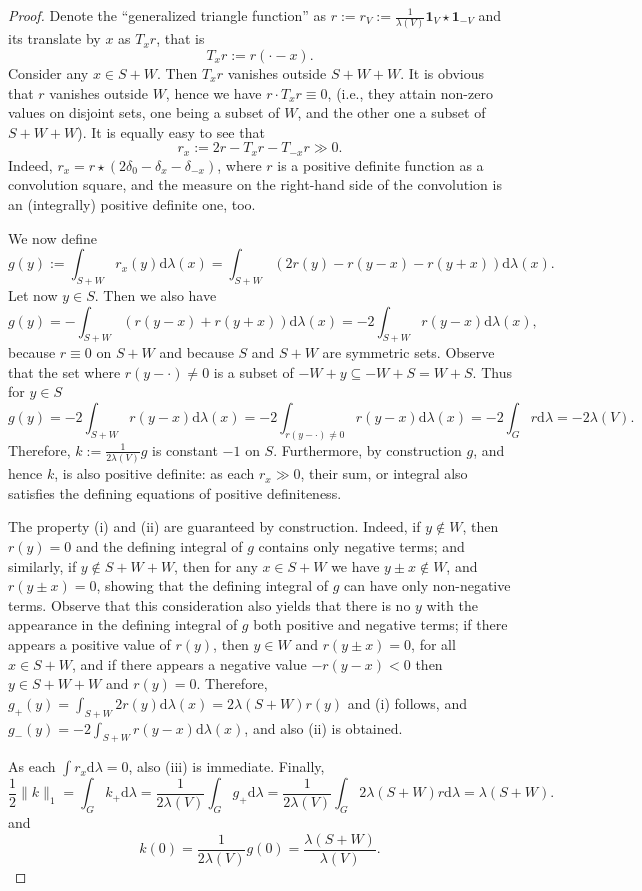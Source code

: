 \documentclass[[a4paper,english,12pt]{amsart}
\theoremstyle{plain}
\theoremstyle{remark}
\def\dd{\mathrm{d}}
\def\haar{\lambda}
\def\car{\mathbf{1}}
\begin{document}
\begin{proof} Denote the ``generalized triangle function'' as $r:=r_V:=\frac{1}{\lambda(V)} \car_V \star \car_{-V}$ and its translate by $x$ as $T_xr$, that is
\[
T_xr:=r(\cdot-x).
\]
Consider any $x \in S+ W$. Then $T_xr$ vanishes outside $S+W+W$. It is obvious that $r$ vanishes outside $W$, hence we have $r \cdot T_xr\equiv 0$, (i.e., they attain non-zero values on disjoint sets, one being a subset of $W$, and the other one a subset of $S+W+W$). It is equally easy to see that
\[
r_x := 2r-T_x r - T_{-x} r \gg 0.
\]
Indeed, $r_x = r \star (2\delta_0-\delta_x-\delta_{-x})$, where $r$ is a positive definite function as a convolution square, and the measure on the right-hand side of the convolution is an (integrally) positive definite one, too.

We now define
\[
g(y):=\int_{S+W} r_x(y) \dd \lambda(x) = \int_{S+W} (2r(y)-r(y-x)-r(y+x)) \dd\lambda(x).
\]
Let now $y \in S$. Then we also have
\[
g(y) = - \int_{S+W} (r(y-x) +r(y+x)) \dd \lambda(x) = - 2 \int_{S+W} r(y-x) \dd \lambda(x),
\]
because $r \equiv 0$ on $S+W$ and because $S$ and $S+W$ are symmetric sets. Observe that the set where $r(y-\cdot) \ne 0$ is a subset of $-W + y \subseteq  -W+S = W+S$. Thus for $y \in S$
\[
g(y)=- 2 \int_{S+W} r( y-x) \dd \lambda(x) = -2 \int_{r(y-\cdot)\ne 0} r( y-x)\dd \lambda(x) = -2 \int_G r\dd\haar = -2 \lambda(V).
\]
Therefore, $k:=\frac{1}{2\lambda(V)} g$ is constant $-1$ on $S$. Furthermore, by construction $g$, and hence $k$, is also positive definite: as each $r_x \gg 0$, their sum, or integral also satisfies the defining equations of positive definiteness.

The property (i) and (ii) are guaranteed by construction. Indeed, if $y \not\in W$, then $r(y)=0$ and the defining integral of $g$ contains only negative terms; and similarly, if $y \not\in S+W+W$, then for any $x \in S+W$ we have $y \pm x \not\in W$, and $r(y \pm x) =0$, showing that the defining integral of $g$ can have only non-negative terms. Observe that this consideration also yields that there is no $y$ with the appearance in the defining integral of $g$ both positive and negative terms; if there appears a positive value of $r(y)$, then $y \in W$ and $r(y \pm x)= 0$, for all $x \in S+W$, and if there appears a negative value $-r(y-x)<0$ then $y \in S+W+W$ and $r(y)=0$. Therefore, $g_{+}(y)=\int_{S+W} 2r(y) \dd \lambda(x) = 2 \lambda(S+W) r(y)$ and (i) follows, and $g_{-}(y)=-2 \int_{S+W} r(y-x) \dd \lambda(x)$, and also (ii) is obtained.

As each $\int r_x\dd\haar =0$, also (iii) is immediate. Finally,
\[
\frac12 \|k\|_1 = \int_G k_{+} \dd\haar= \frac{1}{2\lambda(V)} \int_G g_{+}\dd\haar = \frac{1}{2\lambda(V)} \int_G 2 \lambda(S+W) r\dd\haar = \lambda(S+W) .
\]
and
\[
k(0) = \frac{1}{2\lambda(V)} g(0) = \frac{\lambda(S+W)}{\lambda(V)}.
\]
\end{proof}
\end{document}
